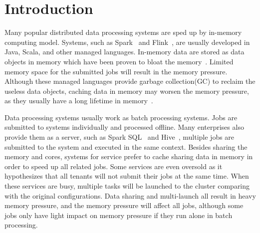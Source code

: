 \section{Introduction}

Many popular distributed data processing systems are sped up by in-memory computing model. Systems, such as Spark~\cite{zaharia2012resilient} and Flink~\cite{hueske2012opening}, are usually developed in Java, Scala, and other managed languages. In-memory data are stored as data objects in memory which have been proven to bloat the memory~\cite{bu:bloat}. Limited memory space for the submitted jobs will result in the memory pressure. Although these managed languages provide garbage collection(GC) to reclaim the useless data objects, caching data in memory may worsen the memory pressure, as they usually have a long lifetime in memory~\cite{lulu:deca}. 

Data processing systems usually work as batch processing systems. Jobs are submitted to systems individually and processed offline. Many enterprises also provide them as a server, such as Spark SQL~\cite{armbrust2015spark} and Hive~\cite{ashish:hive}, multiple jobs are submitted to the system and executed in the same context. Besides sharing the memory and cores, systems for service prefer to cache sharing data in memory in order to speed up all related jobs.
Some services are even oversold as it hypothesizes that all tenants will not submit their jobs at the same time. When these services are busy, multiple tasks will be launched to the cluster comparing with the original configurations. Data sharing and multi-launch all result in heavy memory pressure, and the memory pressure will affect all jobs, although some jobs only have light impact on memory pressure if they run alone in batch processing.


